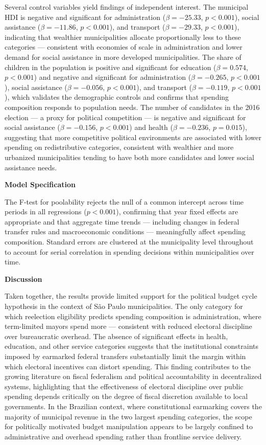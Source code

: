 \documentclass[12pt, a4paper]{article}
\begin{document}
Several control variables yield findings of independent interest. The municipal HDI is negative and significant for administration ($\beta = -25.33$, $p < 0.001$), social assistance ($\beta = -11.86$, $p < 0.001$), and transport ($\beta = -29.33$, $p < 0.001$), indicating that wealthier municipalities allocate proportionally less to these categories --- consistent with economies of scale in administration and lower demand for social assistance in more developed municipalities. The share of children in the population is positive and significant for education ($\beta = 0.574$, $p < 0.001$) and negative and significant for administration ($\beta = -0.265$, $p < 0.001$), social assistance ($\beta = -0.056$, $p < 0.001$), and transport ($\beta = -0.119$, $p < 0.001$), which validates the demographic controls and confirms that spending composition responds to population needs. The number of candidates in the 2016 election --- a proxy for political competition --- is negative and significant for social assistance ($\beta = -0.156$, $p < 0.001$) and health ($\beta = -0.236$, $p = 0.015$), suggesting that more competitive political environments are associated with lower spending on redistributive categories, consistent with wealthier and more urbanized municipalities tending to have both more candidates and lower social assistance needs.

\textbf{{\large Model Specification}}

The F-test for poolability rejects the null of a common intercept across time periods in all regressions ($p < 0.001$), confirming that year fixed effects are appropriate and that aggregate time trends --- including changes in federal transfer rules and macroeconomic conditions --- meaningfully affect spending composition. Standard errors are clustered at the municipality level throughout to account for serial correlation in spending decisions within municipalities over time.

\textbf{{\large Discussion}}

Taken together, the results provide limited support for the political budget cycle hypothesis in the context of São Paulo municipalities. The only category for which reelection eligibility predicts spending composition is administration, where term-limited mayors spend more --- consistent with reduced electoral discipline over bureaucratic overhead. The absence of significant effects in health, education, and other service categories suggests that the institutional constraints imposed by earmarked federal transfers substantially limit the margin within which electoral incentives can distort spending. This finding contributes to the growing literature on fiscal federalism and political accountability in decentralized systems, highlighting that the effectiveness of electoral discipline over public spending depends critically on the degree of fiscal discretion available to local governments. In the Brazilian context, where constitutional earmarking covers the majority of municipal revenue in the two largest spending categories, the scope for politically motivated budget manipulation appears to be largely confined to administrative and overhead spending rather than frontline service delivery.



\end{document}
